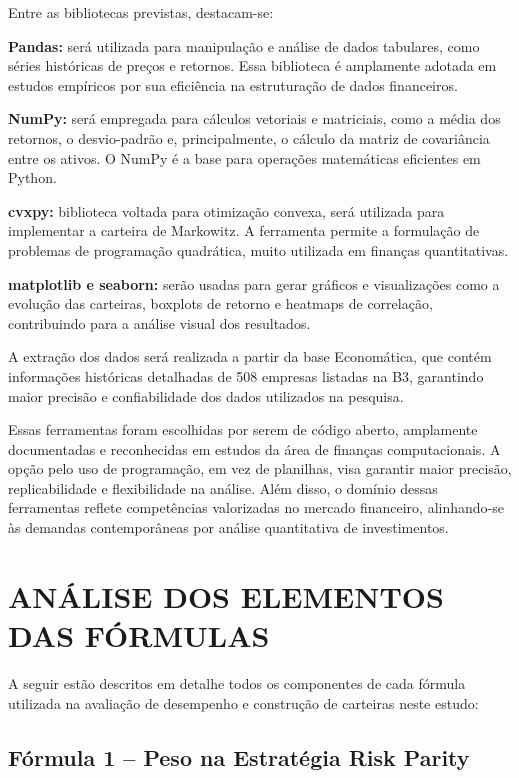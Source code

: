 Entre as bibliotecas previstas, destacam-se:

\textbf{Pandas:} será utilizada para manipulação e análise de dados tabulares, como séries históricas de preços e retornos. Essa biblioteca é amplamente adotada em estudos empíricos por sua eficiência na estruturação de dados financeiros.

\textbf{NumPy:} será empregada para cálculos vetoriais e matriciais, como a média dos retornos, o desvio-padrão e, principalmente, o cálculo da matriz de covariância entre os ativos. O NumPy é a base para operações matemáticas eficientes em Python.

\textbf{cvxpy:} biblioteca voltada para otimização convexa, será utilizada para implementar a carteira de Markowitz. A ferramenta permite a formulação de problemas de programação quadrática, muito utilizada em finanças quantitativas.

\textbf{matplotlib e seaborn:} serão usadas para gerar gráficos e visualizações como a evolução das carteiras, boxplots de retorno e heatmaps de correlação, contribuindo para a análise visual dos resultados.

A extração dos dados será realizada a partir da base Economática, que contém informações históricas detalhadas de 508 empresas listadas na B3, garantindo maior precisão e confiabilidade dos dados utilizados na pesquisa.

Essas ferramentas foram escolhidas por serem de código aberto, amplamente documentadas e reconhecidas em estudos da área de finanças computacionais. A opção pelo uso de programação, em vez de planilhas, visa garantir maior precisão, replicabilidade e flexibilidade na análise. Além disso, o domínio dessas ferramentas reflete competências valorizadas no mercado financeiro, alinhando-se às demandas contemporâneas por análise quantitativa de investimentos.

\section{ANÁLISE DOS ELEMENTOS DAS FÓRMULAS}

A seguir estão descritos em detalhe todos os componentes de cada fórmula utilizada na avaliação de desempenho e construção de carteiras neste estudo:

\subsection{Fórmula 1 -- Peso na Estratégia Risk Parity}


